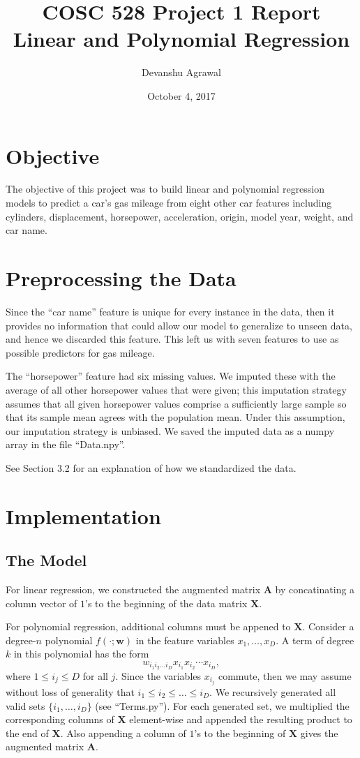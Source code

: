 \documentclass[12pt]{article}
\title{COSC 528 Project 1 Report \\
Linear and Polynomial Regression}
\author{Devanshu Agrawal}
\date{October 4, 2017}
\begin{document}
\maketitle

\section{Objective}

The objective of this project was to build linear and polynomial regression models to predict a car's gas mileage from eight other car features including cylinders, displacement, horsepower, acceleration, origin, model year, weight, and car name.

\section{Preprocessing the Data}

Since the ``car name'' feature is unique for every instance in the data, then it provides no information that could allow our model to generalize to unseen data, and hence we discarded this feature. This left us with seven features to use as possible predictors for gas mileage.

The ``horsepower'' feature had six missing values. We imputed these with the average of all other horsepower values that were given; this imputation strategy assumes that all given horsepower values comprise a sufficiently large sample so that its sample mean agrees with the population mean. Under this assumption, our imputation strategy is unbiased. We saved the imputed data as a numpy array in the file ``Data.npy''.

See Section 3.2 for an explanation of how we standardized the data.

\section{Implementation}

\subsection{The Model}

For linear regression, we constructed the augmented matrix $\mathbf{A}$ by concatinating a column vector of $1$'s to the beginning of the data matrix $\mathbf{X}$.

For polynomial regression, additional columns must be appened to $\mathbf{X}$. Consider a degree-$n$ polynomial $f(\cdot; \mathbf{w})$ in the feature variables $x_1,\ldots,x_D$. A term of degree $k$ in this polynomial has the form
\[ w_{i_1i_2\ldots i_D} x_{i_1}x_{i_2}\cdots x_{i_D}, \]
where $1\leq i_j \leq D$ for all $j$. Since the variables $x_{i_j}$ commute, then we may assume without loss of generality that $i_1\leq i_2\leq \ldots \leq i_D$. We recursively generated all valid sets $\{i_1,\ldots,i_D\}$ (see ``Terms.py''). For each generated set, we multiplied the corresponding columns of $\mathbf{X}$ element-wise and appended the resulting product to the end of $\mathbf{X}$. Also appending a column of $1$'s to the beginning of $\mathbf{X}$ gives the augmented matrix $\mathbf{A}$.
\end{document}
